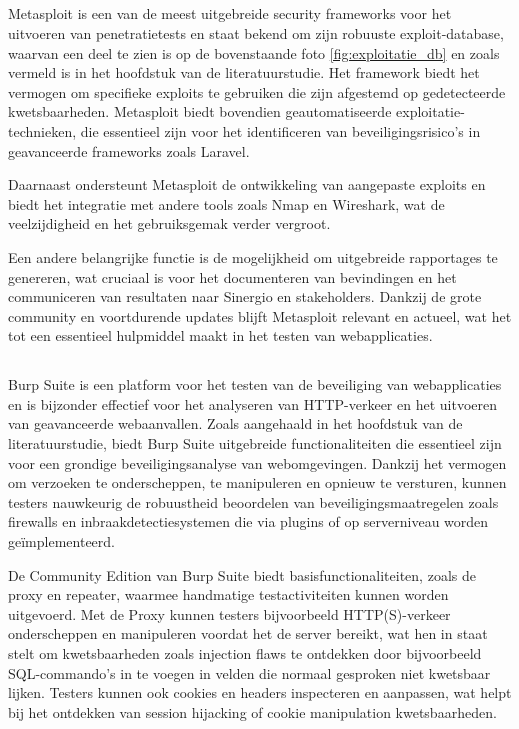 \subsection{}
Metasploit is een van de meest uitgebreide security frameworks voor het uitvoeren van penetratietests en staat bekend om 
zijn robuuste exploit-database, waarvan een deel te zien is op de bovenstaande foto \ref{fig:exploitatie_db} en zoals vermeld is in het hoofdstuk  van de 
literatuurstudie. Het framework biedt het vermogen om specifieke exploits te gebruiken die zijn afgestemd op gedetecteerde 
kwetsbaarheden. Metasploit biedt bovendien geautomatiseerde exploitatie-technieken, die essentieel zijn voor het identificeren 
van beveiligingsrisico's in geavanceerde frameworks zoals Laravel. 

Daarnaast ondersteunt Metasploit de ontwikkeling van 
aangepaste exploits en biedt het integratie met andere tools zoals Nmap en Wireshark, wat de veelzijdigheid en het 
gebruiksgemak verder vergroot. 

Een andere belangrijke functie is de mogelijkheid om uitgebreide rapportages te genereren, 
wat cruciaal is voor het documenteren van bevindingen en het communiceren van resultaten naar Sinergio en stakeholders. Dankzij de grote 
community en voortdurende updates blijft Metasploit relevant en actueel, wat het tot een essentieel hulpmiddel maakt in het 
testen van webapplicaties.

\subsection{}
Burp Suite is een platform voor het testen van de beveiliging van webapplicaties en is bijzonder effectief voor 
het analyseren van HTTP-verkeer en het uitvoeren van geavanceerde webaanvallen. Zoals aangehaald in het hoofdstuk  
van de literatuurstudie, biedt Burp Suite uitgebreide functionaliteiten die essentieel zijn voor een grondige beveiligingsanalyse 
van webomgevingen. Dankzij het vermogen om verzoeken te onderscheppen, te manipuleren en opnieuw te versturen, kunnen 
testers nauwkeurig de robuustheid beoordelen van beveiligingsmaatregelen zoals firewalls en inbraakdetectiesystemen die via 
plugins of op serverniveau worden geïmplementeerd. 

De Community Edition van Burp Suite biedt basisfunctionaliteiten, zoals de proxy en repeater, 
waarmee handmatige testactiviteiten kunnen worden uitgevoerd. Met de Proxy kunnen testers bijvoorbeeld HTTP(S)-verkeer 
onderscheppen en manipuleren voordat het de server bereikt, wat hen in staat stelt om kwetsbaarheden zoals injection flaws 
te ontdekken door bijvoorbeeld SQL-commando's in te voegen in velden die normaal gesproken niet kwetsbaar lijken. Testers 
kunnen ook cookies en headers inspecteren en aanpassen, wat helpt bij het ontdekken van session hijacking of cookie 
manipulation kwetsbaarheden.

